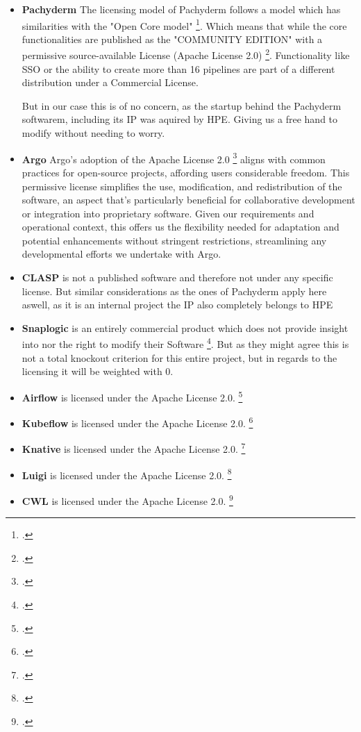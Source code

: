 \begin{itemize}
    \item \textbf{Pachyderm} 
    The licensing model of Pachyderm follows a model which has similarities with the "Open Core model" \footcite{PahcydermPricing2022}.
    Which means that while the core functionalities are published as the "COMMUNITY EDITION" with a permissive source-available License (Apache License 2.0) \footcite{PachydermLICENSEMaster}.
    Functionality like \ac{SSO} or the ability to create more than 16 pipelines are part of a different distribution under a Commercial License.

    But in our case this is of no concern, as the startup behind the Pachyderm softwarem, including its \ac{IP} was aquired by \ac{HPE}.
    Giving us a free hand to modify without needing to worry.

    \item \textbf{Argo} 
    Argo's adoption of the Apache License 2.0 \footcite{ArgocdLICENSEMaster} aligns with common practices for open-source projects, affording users considerable freedom. This permissive license simplifies the use, modification, and redistribution of the software, an aspect that's particularly beneficial for collaborative development or integration into proprietary software. Given our requirements and operational context, this offers us the flexibility needed for adaptation and potential enhancements without stringent restrictions, streamlining any developmental efforts we undertake with Argo.
    \item \textbf{\ac{CLASP}} is not a published software and therefore not under any specific license.
    But similar considerations as the ones of Pachyderm apply here aswell, as it is an internal project the \ac{IP} also completely belongs to \ac{HPE}

    \item \textbf{Snaplogic} is an entirely commercial product which does not provide insight into nor the right to modify their Software \footcite{SnapLogicMasterSubscription}.
    But as they might agree this is not a total knockout criterion for this entire project, but in regards to the licensing it will be weighted with 0.
    \item \textbf{Airflow} is licensed under the Apache License 2.0. \footcite{LicenseAirflowDocumentation}
    \item \textbf{Kubeflow} is licensed under the Apache License 2.0. \footcite{KubeflowLICENSEMaster}
    \item \textbf{Knative} is licensed under the Apache License 2.0. \footcite{KnativeDocsLICENSE}
    \item \textbf{Luigi} is licensed under the Apache License 2.0. \footcite{LuigiLICENSEMaster}
    \item \textbf{CWL} is licensed under the Apache License 2.0. \footcite{CwlutilsLICENSEMain}
    
\end{itemize}

